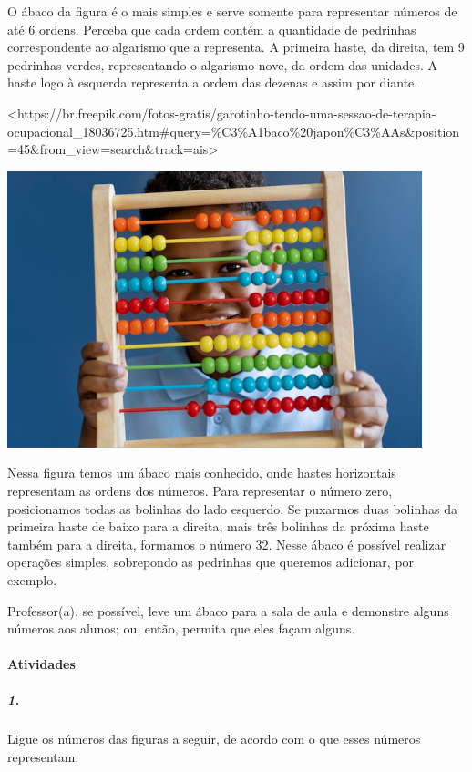 O ábaco da figura é o mais simples e serve somente para representar
números de até 6 ordens. Perceba que cada ordem contém a quantidade de
pedrinhas correspondente ao algarismo que a representa. A primeira haste, da direita, tem 9 pedrinhas verdes, representando o algarismo
nove, da ordem das unidades. A haste logo à esquerda representa a
ordem das dezenas e assim por diante.

\textless{}https://br.freepik.com/fotos-gratis/garotinho-tendo-uma-sessao-de-terapia-ocupacional\_18036725.htm\#query=\%C3\%A1baco\%20japon\%C3\%AAs\&position=45\&from\_view=search\&track=ais\textgreater{}

\includegraphics[width=4.73800in,height=3.15625in]{media/image2.jpeg}

Nessa figura temos um ábaco mais conhecido, onde hastes
horizontais representam as ordens dos números. Para representar o
número zero, posicionamos todas as bolinhas do lado esquerdo. Se
puxarmos duas bolinhas da primeira haste de baixo para a direita, mais
três bolinhas da próxima haste também para a direita, formamos o número
32. Nesse ábaco é possível realizar operações simples, sobrepondo as
pedrinhas que queremos adicionar, por exemplo.

Professor(a), se possível, leve um ábaco para a sala de aula e demonstre
alguns números aos alunos; ou, então, permita que eles façam alguns.

\paragraph{Atividades }\label{atividades}

\subparagraph{1.}\label{section}

Ligue os números das figuras a seguir, de acordo com o que esses números
representam.

